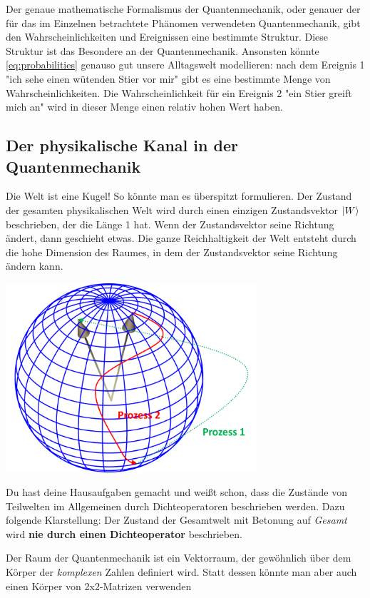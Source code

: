 \documentclass[12pt]{book}
\begin{document}
Der genaue mathematische Formalismus der Quantenmechanik, oder genauer der für das im Einzelnen betrachtete Phänomen verwendeten Quantenmechanik, gibt den Wahrscheinlichkeiten und Ereignissen eine bestimmte Struktur. Diese Struktur ist das Besondere an der Quantenmechanik. Ansonsten könnte \ref{eq:probabilities} genauso gut unsere Alltagswelt modellieren: nach dem Ereignis 1 "ich sehe einen wütenden Stier vor mir" gibt es eine bestimmte Menge von Wahrscheinlichkeiten. Die Wahrscheinlichkeit für ein Ereignis 2 "ein Stier greift mich an" wird in dieser Menge einen relativ hohen Wert haben.

\subsection{Der physikalische Kanal in der Quantenmechanik}

Die Welt ist eine Kugel! So könnte man es überspitzt formulieren. Der Zustand der gesamten physikalischen Welt wird durch einen einzigen Zustandsvektor $\ket{W}$ beschrieben, der die Länge 1 hat. Wenn der Zustandsvektor seine Richtung ändert, dann geschieht etwas. Die ganze Reichhaltigkeit der Welt entsteht durch die hohe Dimension  des Raumes, in dem der Zustandsvektor seine Richtung ändern kann. 

\begin{center}
\includegraphics[width=0.7\textwidth]{Bilder/Prozesse.png}
\end{center}

Du hast deine Hausaufgaben gemacht und weißt schon, dass die Zustände von Teilwelten im Allgemeinen durch Dichteoperatoren beschrieben werden. Dazu folgende Klarstellung: Der Zustand der Gesamtwelt mit Betonung auf \emph{Gesamt} wird \textbf{nie durch einen Dichteoperator} beschrieben. 

Der Raum der Quantenmechanik ist ein Vektorraum, der gewöhnlich über dem Körper der \emph{komplexen} Zahlen definiert wird. Statt dessen könnte man aber auch einen Körper von 2x2-Matrizen verwenden
\end{document}
